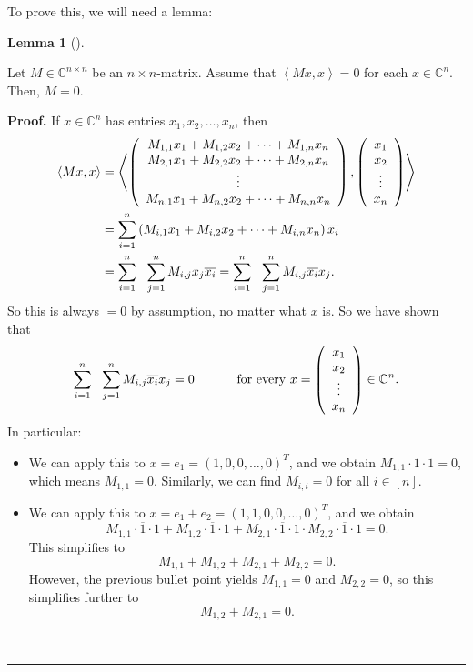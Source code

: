 \documentclass[numbers=enddot,12pt,final,onecolumn,notitlepage]{scrartcl}%
\numberwithin{exer}{subsection}
\theoremstyle{definition}
\newtheorem{lem}[theo]{Lemma}
\newenvironment{lemma}[1][]
{\begin{lem}[#1]\begin{leftbar}}
{\end{leftbar}\end{lem}}
\newenvironment{proof}[1][Proof]{\noindent\textbf{#1.} }{\ \rule{0.5em}{0.5em}}
\let\sumnonlimits\sum
\renewcommand{\sum}{\sumnonlimits\limits}
\begin{document}
To prove this, we will need a lemma:

\begin{lemma}
Let $M\in\mathbb{C}^{n\times n}$ be an $n\times n$-matrix. Assume that
$\left\langle Mx,x\right\rangle =0$ for each $x\in\mathbb{C}^{n}$. Then, $M=0$.
\end{lemma}

\begin{proof}
If $x\in\mathbb{C}^{n}$ has entries $x_{1},x_{2},\ldots,x_{n}$, then%
\begin{align*}
\left\langle Mx,x\right\rangle  & =\left\langle \left(
\begin{array}
[c]{c}%
M_{1,1}x_{1}+M_{1,2}x_{2}+\cdots+M_{1,n}x_{n}\\
M_{2,1}x_{1}+M_{2,2}x_{2}+\cdots+M_{2,n}x_{n}\\
\vdots\\
M_{n,1}x_{1}+M_{n,2}x_{2}+\cdots+M_{n,n}x_{n}%
\end{array}
\right)  ,\left(
\begin{array}
[c]{c}%
x_{1}\\
x_{2}\\
\vdots\\
x_{n}%
\end{array}
\right)  \right\rangle \\
& =\sum_{i=1}^{n}\left(  M_{i,1}x_{1}+M_{i,2}x_{2}+\cdots+M_{i,n}x_{n}\right)
\overline{x_{i}}\\
& =\sum_{i=1}^{n}\ \ \sum_{j=1}^{n}M_{i,j}x_{j}\overline{x_{i}}=\sum_{i=1}%
^{n}\ \ \sum_{j=1}^{n}M_{i,j}\overline{x_{i}}x_{j}.
\end{align*}
So this is always $=0$ by assumption, no matter what $x$ is. So we have shown
that%
\[
\sum_{i=1}^{n}\ \ \sum_{j=1}^{n}M_{i,j}\overline{x_{i}}x_{j}%
=0\ \ \ \ \ \ \ \ \ \ \text{for every }x=\left(
\begin{array}
[c]{c}%
x_{1}\\
x_{2}\\
\vdots\\
x_{n}%
\end{array}
\right)  \in\mathbb{C}^{n}.
\]
In particular:

\begin{itemize}
\item We can apply this to $x=e_{1}=\left(  1,0,0,\ldots,0\right)  ^{T}$, and
we obtain $M_{1,1}\cdot\overline{1}\cdot1=0$, which means $M_{1,1}=0$.
Similarly, we can find $M_{i,i}=0$ for all $i\in\left[  n\right]  $.

\item We can apply this to $x=e_{1}+e_{2}=\left(  1,1,0,0,\ldots,0\right)
^{T}$, and we obtain
\[
M_{1,1}\cdot\overline{1}\cdot1+M_{1,2}\cdot\overline{1}\cdot1+M_{2,1}%
\cdot\overline{1}\cdot1\cdot M_{2,2}\cdot\overline{1}\cdot1=0.
\]
This simplifies to%
\[
M_{1,1}+M_{1,2}+M_{2,1}+M_{2,2}=0.
\]
However, the previous bullet point yields $M_{1,1}=0$ and $M_{2,2}=0$, so this
simplifies further to%
\[
M_{1,2}+M_{2,1}=0.
\]



\end{itemize}
\end{proof}
\end{document}
